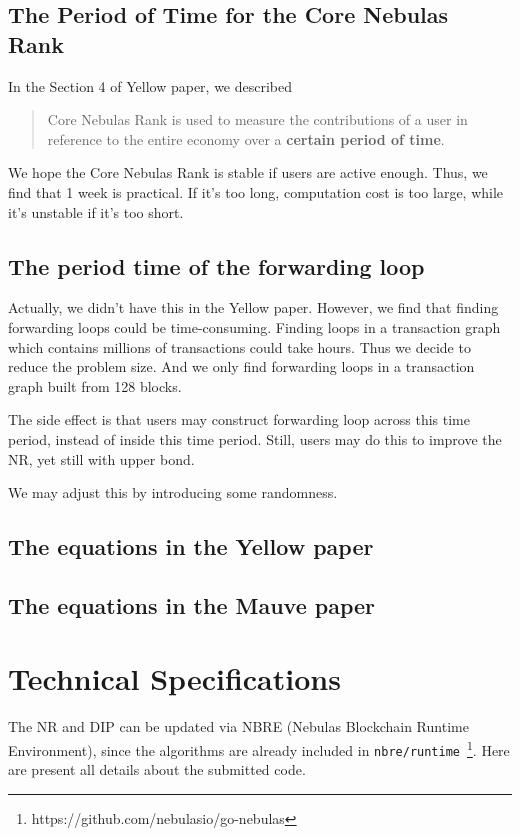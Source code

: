 \documentclass[11pt]{article}
\begin{document}
\subsection{The Period of Time for the Core Nebulas Rank}
In the Section 4 of Yellow paper, we described
\begin{quote}
Core Nebulas Rank is used to measure the contributions of a user in reference
  to the entire economy over a \textbf{certain period of time}.
\end{quote}
\noindent We hope the Core Nebulas Rank is stable if users are active enough.
Thus, we find that 1 week is  practical. If it's too long, computation cost is
too large, while it's unstable if it's too short.

\subsection{The period time of the forwarding loop}
Actually, we didn't have this in the Yellow paper. However, we find that
finding forwarding loops could be time-consuming. Finding loops in a
transaction graph which contains millions of transactions could take hours.
Thus we decide to reduce the problem size. And we only find forwarding loops in
a transaction graph built from 128 blocks.

The side effect is that users may construct forwarding loop across this time
period, instead of inside this time period. Still, users may do this to improve
the NR, yet still with upper bond.

We may adjust this by introducing some randomness.

\subsection{The equations in the Yellow paper}

\subsection{The equations in the Mauve paper}

\section{Technical Specifications}

The NR and DIP can be updated via NBRE (Nebulas Blockchain Runtime
Environment), since the algorithms are already included in
\texttt{nbre/runtime}~\footnote{https://github.com/nebulasio/go-nebulas}. Here
are present all details about the submitted code.
\end{document}
